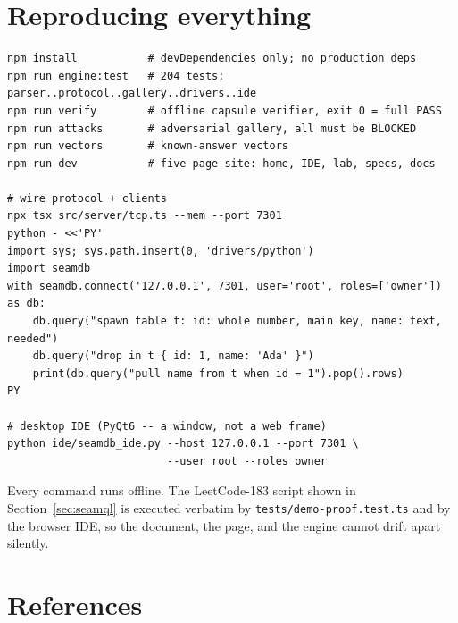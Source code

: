 \documentclass[11pt]{article}
\newcommand{\code}[1]{\texttt{#1}}
\begin{document}
\section{Reproducing everything}
\label{sec:repro}

\begin{lstlisting}[language={},basicstyle=\ttfamily\small]
npm install           # devDependencies only; no production deps
npm run engine:test   # 204 tests: parser..protocol..gallery..drivers..ide
npm run verify        # offline capsule verifier, exit 0 = full PASS
npm run attacks       # adversarial gallery, all must be BLOCKED
npm run vectors       # known-answer vectors
npm run dev           # five-page site: home, IDE, lab, specs, docs

# wire protocol + clients
npx tsx src/server/tcp.ts --mem --port 7301
python - <<'PY'
import sys; sys.path.insert(0, 'drivers/python')
import seamdb
with seamdb.connect('127.0.0.1', 7301, user='root', roles=['owner']) as db:
    db.query("spawn table t: id: whole number, main key, name: text, needed")
    db.query("drop in t { id: 1, name: 'Ada' }")
    print(db.query("pull name from t when id = 1").pop().rows)
PY

# desktop IDE (PyQt6 -- a window, not a web frame)
python ide/seamdb_ide.py --host 127.0.0.1 --port 7301 \
                         --user root --roles owner
\end{lstlisting}

Every command runs offline. The LeetCode-183 script shown in
Section~\ref{sec:seamql} is executed verbatim by
\code{tests/demo-proof.test.ts} and by the browser IDE, so the document, the
page, and the engine cannot drift apart silently.

\section{References}
\label{sec:refs}
\end{document}
